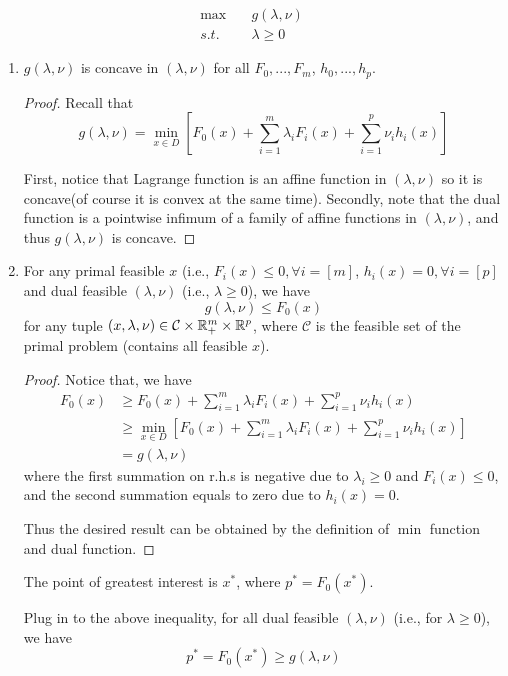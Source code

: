 \begin{align*}
\max \quad&g(\lambda, \nu) \\
s.t. \quad&\lambda \geq 0
\end{align*}
\begin{enumerate}

\item $g(\lambda, \nu)$ is concave in $(\lambda, \nu)$ for all $F_0,...,F_m$, $h_0,...,h_p$.

\begin{proof}
Recall that
$$g(\lambda, \nu) =\min_{x\in D}[F_0(x) + \sum^m_{i=1}\lambda_iF_i(x) + \sum^p_{i=1}\nu_ih_i(x) ]$$

First, notice that Lagrange function is an affine function in $(\lambda, \nu)$ so it is concave(of course it is convex at the same time). Secondly, note that the dual function is a pointwise infimum of a family of affine functions in $(\lambda, \nu)$, and thus $g(\lambda, \nu)$ is concave.
\end{proof}

\item For any primal feasible $x$ (i.e., $F_i(x)\leq 0, \forall i = [m]$, $h_i(x)= 0,\forall i = [p]$ and dual feasible $(\lambda, \nu)$ (i.e., $\lambda \geq 0$), we have
	$$g(\lambda, \nu)\leq F_0(x)$$
    for any tuple $(x, \lambda, \nu) \in \mathcal{C}\times \mathbb{R}^m_+\times \mathbb{R}^p$, where $\mathcal{C}$ is the feasible set of the primal problem (contains all feasible $x$).

\begin{proof}
	Notice that, we have
	\begin{align*}
	F_0(x) &\geq F_0(x) + \sum^m_{i=1}\lambda_iF_i(x) + \sum^p_{i=1}\nu_ih_i(x)\\
	&\geq \min_{x\in D} [F_0(x) + \sum^m_{i=1}\lambda_iF_i(x) + \sum^p_{i=1}\nu_ih_i(x)] \\
	&= g(\lambda, \nu)
	\end{align*}
	where the first summation on r.h.s is negative due to $\lambda_i\geq 0$ and $F_i(x)\leq 0$, and the second summation equals to zero due to $h_i(x)=0$. 
	
	Thus the desired result can be obtained by the definition of $\min$ function and dual function.
\end{proof}

The point of greatest interest is $x^*$, where $p^* = F_0(x^*)$.

Plug in to the above inequality, for all dual feasible $(\lambda, \nu)$ (i.e., for $\lambda \geq 0$), we have
\begin{equation*}
p^* = F_0(x^*) \geq g(\lambda, \nu)
\end{equation*}


\end{enumerate}
